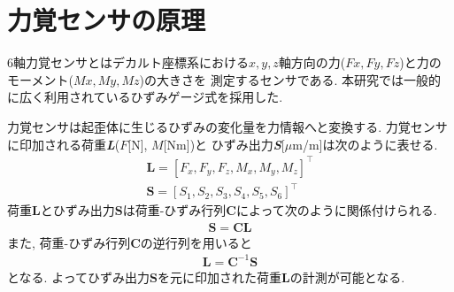 \section{力覚センサの原理}
6軸力覚センサとはデカルト座標系における$x, y, z$軸方向の力($Fx, Fy, Fz$)と力のモーメント($Mx, My, Mz$)の大きさを
測定するセンサである. 本研究では一般的に広く利用されているひずみゲージ式を採用した. 

力覚センサは起歪体に生じるひずみの変化量を力情報へと変換する. 
力覚センサに印加される荷重\textbf{\textit{L}}($F$[N], $M$[Nm])と
ひずみ出力\textbf{\textit{S}}[$\mu$m/m]は次のように表せる. 
\begin{eqnarray}
  \bm{L} = {[F_x, F_y, F_z, M_x, M_y, M_z]}^{\top} \\
  \bm{S} = {[ S_1, S_2, S_3, S_4, S_5, S_6 ]}^{\top}
\end{eqnarray}
荷重$\bm{L}$とひずみ出力$\bm{S}$は荷重-ひずみ行列$\bm{C}$によって次のように関係付けられる. 
\begin{eqnarray}
  \bm{S} = \bm{C}\bm{L}
\end{eqnarray}
また, 荷重-ひずみ行列$\bm{C}$の逆行列を用いると
\begin{eqnarray}
  \bm{L} = \bm{C}^{-1}\bm{S}
  \label{eq:syuturyoku}
\end{eqnarray}
となる. よってひずみ出力$\bm{S}$を元に印加された荷重$\bm{L}$の計測が可能となる. 

